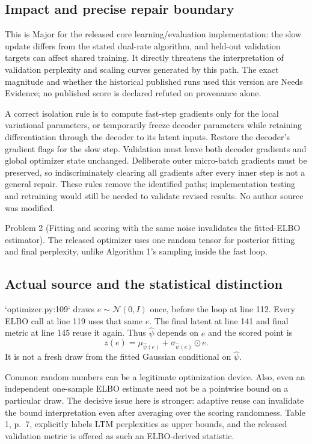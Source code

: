 \documentclass[10pt]{article}
\begin{document}
\subsection*{Impact and precise repair boundary}
This is Major for the released core learning/evaluation implementation: the slow update differs from the stated dual-rate algorithm, and held-out validation targets can affect shared training. It directly threatens the interpretation of validation perplexity and scaling curves generated by this path. The exact magnitude and whether the historical published runs used this version are Needs Evidence; no published score is declared refuted on provenance alone.\par
A correct isolation rule is to compute fast-step gradients only for the local variational parameters, or temporarily freeze decoder parameters while retaining differentiation through the decoder to its latent inputs. Restore the decoder’s gradient flags for the slow step. Validation must leave both decoder gradients and global optimizer state unchanged. Deliberate outer micro-batch gradients must be preserved, so indiscriminately clearing all gradients after every inner step is not a general repair. These rules remove the identified paths; implementation testing and retraining would still be needed to validate revised results. No author source was modified.\par
Problem 2 (Fitting and scoring with the same noise invalidates the fitted-ELBO estimator).  The released optimizer uses one random tensor for posterior fitting and final perplexity, unlike Algorithm 1’s sampling inside the fast loop.\par
\subsection*{Actual source and the statistical distinction}
`optimizer.py:109` draws \(e\sim\mathcal N(0,I)\) once, before the loop at line 112. Every ELBO call at line 119 uses that same \(e\). The final latent at line 141 and final metric at line 145 reuse it again. Thus \(\widehat\psi\) depends on \(e\) and the scored point is \[z(e)=\mu_{\widehat\psi(e)}
      +\sigma_{\widehat\psi(e)}\odot e.\] It is not a fresh draw from the fitted Gaussian conditional on \(\widehat\psi\).\par
Common random numbers can be a legitimate optimization device. Also, even an independent one-sample ELBO estimate need not be a pointwise bound on a particular draw. The decisive issue here is stronger: adaptive reuse can invalidate the bound interpretation even after averaging over the scoring randomness. Table 1, p. 7, explicitly labels LTM perplexities as upper bounds, and the released validation metric is offered as such an ELBO-derived statistic.\par
\end{document}
